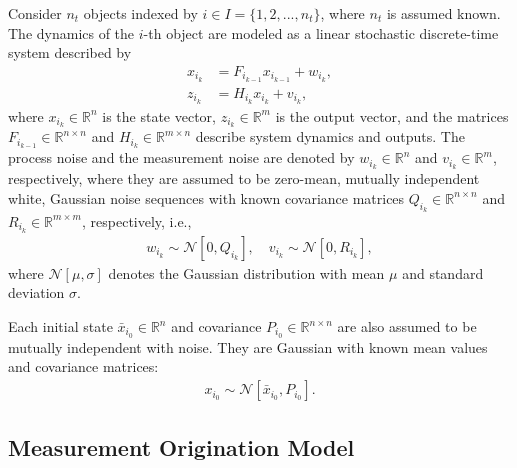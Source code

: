 \documentclass[letterpaper, paper,10pt]{AAS}		%
\renewcommand{\Re}{\ensuremath{\mathbb{R}}}
\begin{document}
Consider $n_t$ objects indexed by $i\in I=\{1,2,...,n_t\}$, where $n_t$ is assumed known.
The dynamics of the $i$-th object are modeled as a linear stochastic discrete-time system described by
\begin{align}
x_{i_{k}} & = F_{i_{k-1}} x_{i_{k-1}} + w_{i_{k}},\label{eqn:xkp}\\
z_{i_k} & = H_{i_k} x_{i_k} + v_{i_k},
\end{align}
where $x_{i_k}\in\Re^n$ is the state vector, $z_{i_k}\in\Re^m$ is the output vector, and  the matrices $F_{i_{k-1}}\in\Re^{n\times n}$ and $H_{i_k}\in\Re^{m\times n}$ describe system dynamics and outputs.
The process noise and the measurement noise are denoted by $w_{i_k}\in\Re^n$ and $v_{i_k}\in\Re^m$, respectively, where they are assumed to be zero-mean, mutually independent white, Gaussian noise sequences with known covariance matrices $Q_{i_k}\in\Re^{n\times n}$ and $R_{i_k}\in\Re^{m\times m}$, respectively, i.e.,
\begin{align}
w_{i_k} \sim \mathcal{N}[0,Q_{i_k}],\quad
v_{i_k} \sim \mathcal{N}[0,R_{i_k}],
\end{align}
where $\mathcal{N}[\mu,\sigma]$ denotes the Gaussian distribution with mean $\mu$ and standard deviation $\sigma$.


Each initial state $\bar x_{i_0}\in\Re^n$ and covariance $P_{i_0}\in\Re^{n\times n}$ are also assumed to be mutually independent with noise. They are Gaussian with known mean values and covariance matrices:
\begin{align}
x_{i_0} \sim \mathcal{N}[\bar x_{i_0}, P_{i_0}].\label{eqn:xi0}
\end{align}

\subsection{Measurement Origination Model}
\label{DAP}

\end{document}
